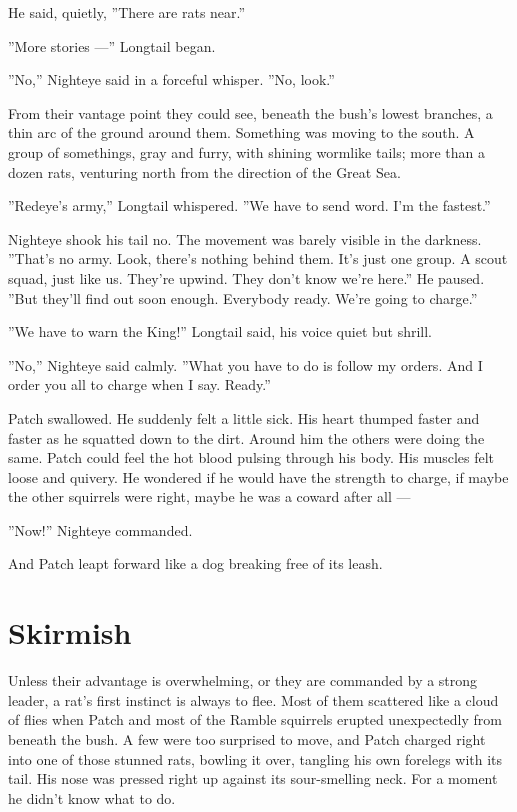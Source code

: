 \documentclass[12pt]{book}
\begin{document}
He said, quietly, ''There are rats near.''

''More stories ---'' Longtail began.

''No,'' Nighteye said in a forceful whisper. ''No, look.''

From their vantage point they could see, beneath the bush's lowest
branches, a thin arc of the ground around them. Something was moving
to the south. A group of somethings, gray and furry, with shining
wormlike tails; more than a dozen rats, venturing north from the
direction of the Great Sea.

''Redeye's army,'' Longtail whispered. ''We have to send word. I'm the
fastest.''

Nighteye shook his tail no. The movement was barely visible in the
darkness. ''That's no army. Look, there's nothing behind them. It's
just one group. A scout squad, just like us. They're upwind. They
don't know we're here.'' He paused. ''But they'll find out soon
enough. Everybody ready. We're going to charge.''

''We have to warn the King!'' Longtail said, his voice quiet but
shrill.

''No,'' Nighteye said calmly. ''What you have to do is follow my
orders. And I order you all to charge when I say. Ready.''

Patch swallowed. He suddenly felt a little sick. His heart thumped
faster and faster as he squatted down to the dirt. Around him the
others were doing the same. Patch could feel the hot blood pulsing
through his body. His muscles felt loose and quivery. He wondered if
he would have the strength to charge, if maybe the other squirrels
were right, maybe he was a coward after all ---

''Now!'' Nighteye commanded.

And Patch leapt forward like a dog breaking free of its leash.


\section{Skirmish}

Unless their advantage is overwhelming, or they are commanded by a
strong leader, a rat's first instinct is always to flee. Most of them
scattered like a cloud of flies when Patch and most of the Ramble
squirrels erupted unexpectedly from beneath the bush. A few were too
surprised to move, and Patch charged right into one of those stunned
rats, bowling it over, tangling his own forelegs with its tail. His
nose was pressed right up against its sour-smelling neck. For a moment
he didn't know what to do.
\end{document}
